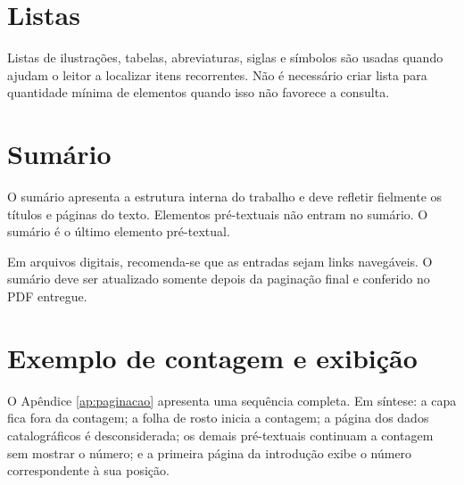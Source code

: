 \section{Listas}

Listas de ilustrações, tabelas, abreviaturas, siglas e símbolos são usadas quando ajudam o leitor a localizar itens recorrentes. Não é necessário criar lista para quantidade mínima de elementos quando isso não favorece a consulta.

\section{Sumário}

O sumário apresenta a estrutura interna do trabalho e deve refletir fielmente os títulos e páginas do texto. Elementos pré-textuais não entram no sumário. O sumário é o último elemento pré-textual.

Em arquivos digitais, recomenda-se que as entradas sejam links navegáveis. O sumário deve ser atualizado somente depois da paginação final e conferido no PDF entregue.

\section{Exemplo de contagem e exibição}

O Apêndice \ref{ap:paginacao} apresenta uma sequência completa. Em síntese: a capa fica fora da contagem; a folha de rosto inicia a contagem; a página dos dados catalográficos é desconsiderada; os demais pré-textuais continuam a contagem sem mostrar o número; e a primeira página da introdução exibe o número correspondente à sua posição.
